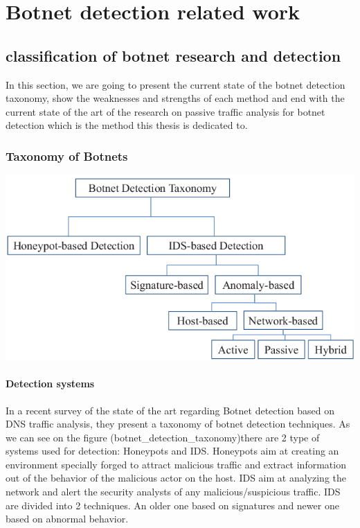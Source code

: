 \section{Botnet detection related work}
\subsection{classification of botnet research and detection}
In this section, we are going to present the current state of the botnet detection taxonomy, show the weaknesses and strengths of each method and end with the current state of the art of the research on passive traffic analysis for botnet detection which is the method this thesis is dedicated to.\\

\subsubsection{Taxonomy of Botnets}

\includegraphics[scale=.8]{img/Botnet-detection-taxonomy.png}
\paragraph{Detection systems}In a recent survey\cite{survey1} of the state of the art regarding Botnet detection based on DNS traffic analysis\cite{survey}, they present a taxonomy of botnet detection techniques. As we can see on the figure (botnet\_detection\_taxonomy)there are 2 type of systems used for detection: Honeypots and IDS. Honeypots aim at creating an environment specially forged to attract malicious traffic and extract information out of the behavior of the malicious actor on the host. IDS aim at analyzing the network and alert the security analysts of any malicious/suspicious traffic. IDS are divided into 2 techniques. An older one based on signatures and newer one based on abnormal behavior.\\\\
